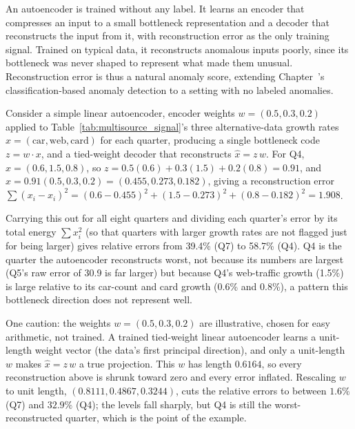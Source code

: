 \documentclass[../ai_in_finance]{subfiles}
\begin{document}
An autoencoder is trained without any label. It learns an encoder that compresses an input to a small bottleneck representation and a decoder that reconstructs the input from it, with reconstruction error as the only training signal. Trained on typical data, it reconstructs anomalous inputs poorly, since its bottleneck was never shaped to represent what made them unusual. Reconstruction error is thus a natural anomaly score, extending Chapter~'s classification-based anomaly detection to a setting with no labeled anomalies.

Consider a simple linear autoencoder, encoder weights $w = (0.5, 0.3, 0.2)$ applied to Table~\ref{tab:multisource_signal}'s three alternative-data growth rates $x = (\text{car}, \text{web}, \text{card})$ for each quarter, producing a single bottleneck code $z = w \cdot x$, and a tied-weight decoder that reconstructs $\hat x = z\, w$. For Q4, $x = (0.6, 1.5, 0.8)$, so $z = 0.5(0.6) + 0.3(1.5) + 0.2(0.8) = 0.91$, and $\hat x = 0.91(0.5, 0.3, 0.2) = (0.455, 0.273, 0.182)$, giving a reconstruction error $\sum(x_i - \hat x_i)^2 = (0.6-0.455)^2 + (1.5-0.273)^2 + (0.8-0.182)^2 = 1.908$.

Carrying this out for all eight quarters and dividing each quarter's error by its total energy $\sum x_i^2$ (so that quarters with larger growth rates are not flagged just for being larger) gives relative errors from 39.4\% (Q7) to 58.7\% (Q4). Q4 is the quarter the autoencoder reconstructs worst, not because its numbers are largest (Q5's raw error of 30.9 is far larger) but because Q4's web-traffic growth (1.5\%) is large relative to its car-count and card growth (0.6\% and 0.8\%), a pattern this bottleneck direction does not represent well.

One caution: the weights $w=(0.5, 0.3, 0.2)$ are illustrative, chosen for easy arithmetic, not trained. A trained tied-weight linear autoencoder learns a unit-length weight vector (the data's first principal direction), and only a unit-length $w$ makes $\hat x = z\,w$ a true projection. This $w$ has length $0.6164$, so every reconstruction above is shrunk toward zero and every error inflated. Rescaling $w$ to unit length, $(0.8111, 0.4867, 0.3244)$, cuts the relative errors to between $1.6\%$ (Q7) and $32.9\%$ (Q4); the levels fall sharply, but Q4 is still the worst-reconstructed quarter, which is the point of the example.
\end{document}

